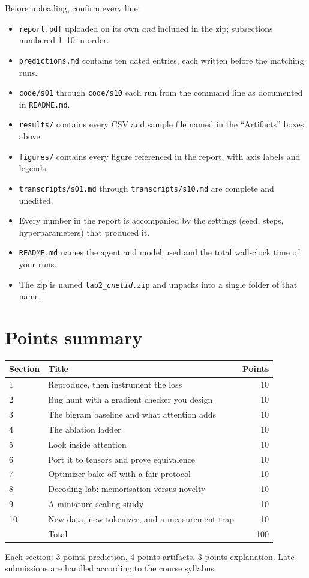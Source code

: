 \documentclass[11pt,letterpaper]{article}
\begin{document}
Before uploading, confirm every line:
\begin{itemize}[label=$\square$]
  \item \texttt{report.pdf} uploaded on its own \emph{and} included in the zip; subsections numbered 1--10 in order.
  \item \texttt{predictions.md} contains ten dated entries, each written before the matching runs.
  \item \texttt{code/s01} through \texttt{code/s10} each run from the command line as documented in \texttt{README.md}.
  \item \texttt{results/} contains every CSV and sample file named in the ``Artifacts'' boxes above.
  \item \texttt{figures/} contains every figure referenced in the report, with axis labels and legends.
  \item \texttt{transcripts/s01.md} through \texttt{transcripts/s10.md} are complete and unedited.
  \item Every number in the report is accompanied by the settings (seed, steps, hyperparameters) that produced it.
  \item \texttt{README.md} names the agent and model used and the total wall-clock time of your runs.
  \item The zip is named \texttt{lab2\_\textit{cnetid}.zip} and unpacks into a single folder of that name.
\end{itemize}

\section*{Points summary}
\begin{center}
\begin{tabular}{@{}llr@{}}
\toprule
Section & Title & Points \\
\midrule
1 & Reproduce, then instrument the loss & 10 \\
2 & Bug hunt with a gradient checker you design & 10 \\
3 & The bigram baseline and what attention adds & 10 \\
4 & The ablation ladder & 10 \\
5 & Look inside attention & 10 \\
6 & Port it to tensors and prove equivalence & 10 \\
7 & Optimizer bake-off with a fair protocol & 10 \\
8 & Decoding lab: memorisation versus novelty & 10 \\
9 & A miniature scaling study & 10 \\
10 & New data, new tokenizer, and a measurement trap & 10 \\
\midrule
 & Total & 100 \\
\bottomrule
\end{tabular}
\end{center}

Each section: 3 points prediction, 4 points artifacts, 3 points explanation. Late submissions are handled according to the course syllabus.

\printbibliography[title={References}]
\end{document}

